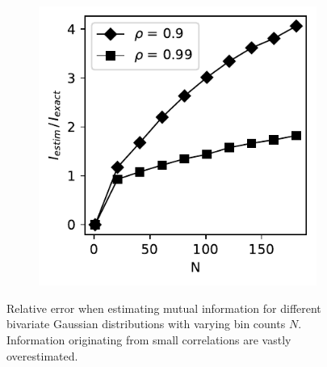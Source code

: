 \documentclass[../Thesis.tex]{subfiles}
\begin{document}
\begin{figure}[H]
\begin{subfigure}[t]{0.32\textwidth}
        \caption{}
        \label{subfig:dd}
    \end{subfigure}%
    ~
    \begin{subfigure}[t]{0.32\textwidth}
        \centering
        \includegraphics[width=\linewidth]{figures/ND examples/MI calc/gaussian example original high corr.pdf}
        \caption{}
        \label{subfig:ddd}
    \end{subfigure}
    \caption{Relative error when estimating mutual information for different bivariate Gaussian distributions with varying bin counts $N$. Information originating from small correlations are vastly overestimated.}
    \label{fig:raw histogram for MI estimation}
\end{figure}
\end{document}
